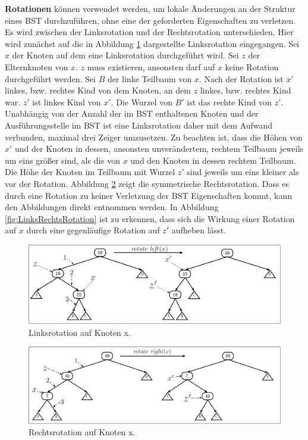 \documentclass[a4paper,12pt]{article}
\begin{document}
\noindent\textbf{Rotationen} können verwendet werden, um lokale Änderungen an der Struktur eines BST durchzuführen, ohne eine der geforderten Eigenschaften zu verletzen. Es wird zwischen der Linksrotation und der Rechtsrotation 
unterschieden. Hier wird zunächst auf die in Abbildung \ref{fig:Linksrotation} dargestellte Linksrotation eingegangen. 
Sei $x$ der Knoten auf dem eine Linksrotation durchgeführt wird. Sei $z$ der Elternknoten von $x$. $z$ muss existieren, ansonsten darf auf $x$ keine Rotation durchgeführt werden. Sei $B$ der linke Teilbaum von $x$. Nach der Rotation ist $x'$ linkes, bzw. rechtes Kind von dem Knoten, an dem $z$ linkes, bzw. rechtes Kind war. $z'$ ist linkes Kind von $x'$. Die Wurzel von $B '$ ist das rechte Kind von $z'$. Unabhängig von der Anzahl der im BST enthaltenen Knoten und der Ausführungsstelle im BST ist eine Linksrotation daher mit dem Aufwand verbunden, maximal drei Zeiger umzusetzen. Zu beachten ist, dass die Höhen von $x'$ und der Knoten in dessen, ansonsten unverändertem, rechtem Teilbaum jeweils um eins größer sind, als die von $x$ und den Knoten in dessen rechtem Teilbaum. Die Höhe der Knoten im Teilbaum mit Wurzel $z'$ sind jeweils um eins kleiner als vor der Rotation.
Abbildung \ref{fig:Rechtsrotation} zeigt die symmetrische Rechtsrotation. Dass es durch eine Rotation zu keiner Verletzung der BST Eigenschaften kommt, kann den Abbildungen direkt entnommen werden. In Abbildung \ref{fig:LinksRechtsRotation} ist zu erkennen, dass sich die Wirkung einer Rotation auf $x$ durch eine gegenläufige Rotation auf $z'$ aufheben lässt.  
\begin{figure}[H]
	\centering
	\includegraphics[width= 1\textwidth]{"Medien/Einleitung/Linksrotation"}
	\caption{Linksrotation auf Knoten x. }
	\label{fig:Linksrotation}
\end{figure}
\begin{figure}[H]
	\centering
	\includegraphics[width= 1\textwidth]{"Medien/Einleitung/Rechtsrotation"}
	\caption{Rechtsrotation auf Knoten x. }
	\label{fig:Rechtsrotation}
\end{figure}
\end{document}
